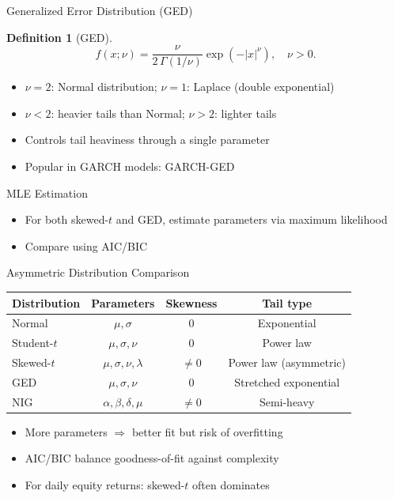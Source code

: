 \documentclass[9pt, aspectratio=169, t]{beamer}
\theoremstyle{definition}
\newtheorem{defn}{Definition}
\begin{document}
\begin{frame}{Generalized Error Distribution (GED)}
\begin{defn}[GED]
\[
f(x;\nu) = \frac{\nu}{2\,\Gamma(1/\nu)}\exp\!\left(-|x|^\nu\right), \quad \nu > 0.
\]
\end{defn}

\begin{itemize}
\item $\nu = 2$: Normal distribution; \quad $\nu = 1$: Laplace (double exponential)
\item $\nu < 2$: heavier tails than Normal; \quad $\nu > 2$: lighter tails
\item Controls tail heaviness through a single parameter
\item Popular in GARCH models: GARCH-GED
\end{itemize}

\vspace{0.2cm}
\begin{block}{MLE Estimation}
\begin{itemize}
\item For both skewed-$t$ and GED, estimate parameters via maximum likelihood
\item Compare using AIC/BIC
\end{itemize}
\end{block}
\end{frame}

\begin{frame}{Asymmetric Distribution Comparison}
\begin{center}
\renewcommand{\arraystretch}{1.1}
\begin{tabular}{lccc}
\toprule
\textbf{Distribution} & \textbf{Parameters} & \textbf{Skewness} & \textbf{Tail type} \\
\midrule
Normal & $\mu, \sigma$ & 0 & Exponential \\
Student-$t$ & $\mu, \sigma, \nu$ & 0 & Power law \\
Skewed-$t$ & $\mu, \sigma, \nu, \lambda$ & $\neq 0$ & Power law (asymmetric) \\
GED & $\mu, \sigma, \nu$ & 0 & Stretched exponential \\
NIG & $\alpha, \beta, \delta, \mu$ & $\neq 0$ & Semi-heavy \\
\bottomrule
\end{tabular}
\end{center}

\begin{itemize}
\item More parameters $\Rightarrow$ better fit but risk of overfitting
\item AIC/BIC balance goodness-of-fit against complexity
\item For daily equity returns: skewed-$t$ often dominates
\end{itemize}
\end{frame}
\end{document}
